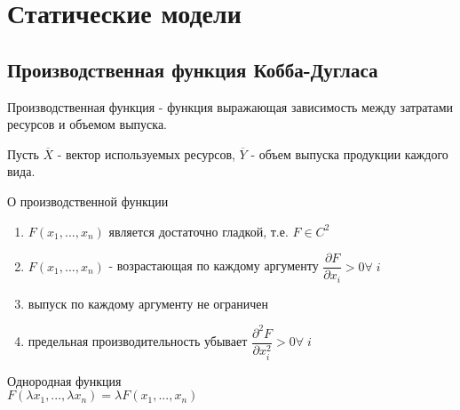 %
%
%
%
% 
\section{Статические модели}
\subsection{Производственная функция Кобба-Дугласа}

\begin{definition}
  Производственная функция - функция выражающая зависимость между затратами ресурсов и объемом выпуска.
\end{definition}

Пусть $\overline{X}$ - вектор используемых ресурсов, $\overline{Y}$ - объем выпуска продукции каждого вида.
\begin{property}{О производственной функции}
\begin{enumerate}
  \item $F(x_1,...,x_n)$ является достаточно гладкой, т.е. $F\in C^2$
  \item $F(x_1,...,x_n)$ - возрастающая по каждому аргументу $\dfrac{\partial F}{\partial x_i}>0 \forall \;i$
  \item выпуск по каждому аргументу не ограничен
  \item предельная производительность убывает $ \dfrac{\partial^2 F}{\partial x_i^2}>0 \forall \;i$
\end{enumerate}
\end{property}

\begin{definition}{Однородная функция}
  \\$F(\lambda x_1, ...,\lambda x_n)=\lambda F(x_1,...,x_n)$
\end{definition}

